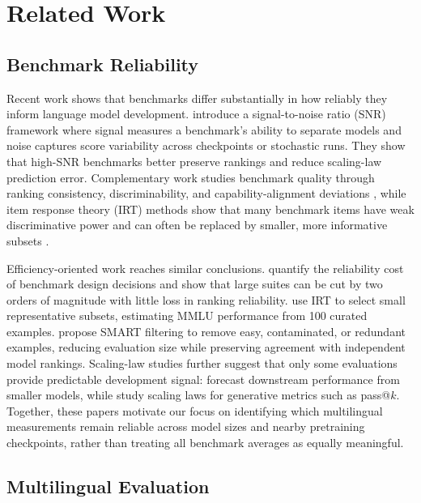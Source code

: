 \section{Related Work}

\subsection{Benchmark Reliability}

Recent work shows that benchmarks differ substantially in how reliably they inform language model development. \citet{heineman_signal_2025} introduce a signal-to-noise ratio (SNR) framework where signal measures a benchmark's ability to separate models and noise captures score variability across checkpoints or stochastic runs. They show that high-SNR benchmarks better preserve rankings and reduce scaling-law prediction error. Complementary work studies benchmark quality through ranking consistency, discriminability, and capability-alignment deviations \citep{qian_benchmark2_2026}, while item response theory (IRT) methods show that many benchmark items have weak discriminative power and can often be replaced by smaller, more informative subsets \citep{zhou_lost_2026,li_adaptive_2025}.

Efficiency-oriented work reaches similar conclusions.
\citet{perlitz_efficient_2024} quantify the reliability cost of benchmark design decisions and show that large suites can be cut by two orders of magnitude with little loss in ranking reliability. \citet{polo_tinybenchmarks_2024} use IRT to select small representative subsets, estimating MMLU performance from 100 curated examples.
\citet{gupta_improving_2025} propose SMART filtering to remove easy, contaminated, or redundant examples, reducing evaluation size while preserving agreement with independent model rankings. Scaling-law studies further suggest that only some evaluations provide predictable development signal: \citet{chen_scaling_2025} forecast downstream performance from smaller models, while \citet{schaeffer_pretraining_2026} study scaling laws for generative metrics such as pass@$k$. Together, these papers motivate our focus on identifying which multilingual measurements remain reliable across model sizes and nearby pretraining checkpoints, rather than treating all benchmark averages as equally meaningful.

\subsection{Multilingual Evaluation}

